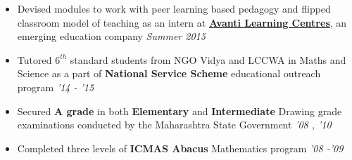 \documentclass[10pt]{article}%
\newcommand{\xfilll}[2][1ex]{
\dimen0=#2\advance\dimen0 by #1
\leaders\hrule height \dimen0 depth -#1\hfill}
\begin{document}
{
\begin{itemize}
\vspace{-4mm}
\setlength\itemsep{0.01em}
    \item Devised modules to work with peer learning based pedagogy and flipped classroom model of teaching as an intern at \href{https://www.avanti.in/about/}{\textbf{Avanti Learning Centres}}, an emerging education company \hfill\textit{Summer 2015}
    \item Tutored $6^{th}$ standard students from NGO Vidya and LCCWA in Maths and Science as a part of \textbf{National Service Scheme} educational outreach program \hfill\textit{'14 - '15} 
    \item Secured \textbf{A grade} in both \textbf{Elementary} and \textbf{Intermediate} Drawing grade examinations conducted by the Maharashtra State Government \hfill\textit{'08 , '10}
    \item Completed three levels of \textbf{ICMAS Abacus} Mathematics program \hfill\textit{'08 -'09}
    
\end{itemize}

}
\end{document}
